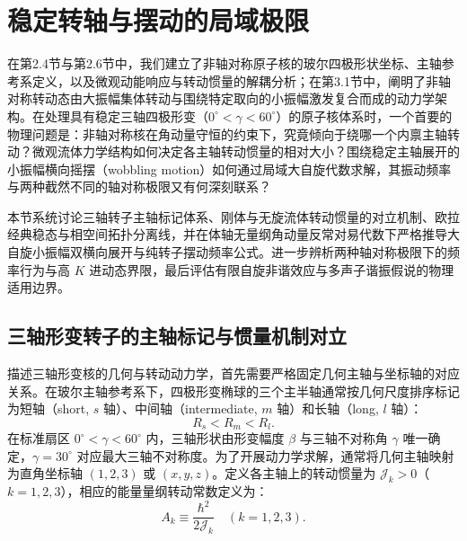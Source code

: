 \section{稳定转轴与摆动的局域极限}\label{sec:3-2}

在第2.4节与第2.6节中，我们建立了非轴对称原子核的玻尔四极形状坐标、主轴参考系定义，以及微观动能响应与转动惯量的解耦分析；在第3.1节中，阐明了非轴对称转动态由大振幅集体转动与围绕特定取向的小振幅激发复合而成的动力学架构。在处理具有稳定三轴四极形变（$0^\circ < \gamma < 60^\circ$）的原子核体系时，一个首要的物理问题是：非轴对称核在角动量守恒的约束下，究竟倾向于绕哪一个内禀主轴转动？微观流体力学结构如何决定各主轴转动惯量的相对大小？围绕稳定主轴展开的小振幅横向摇摆（wobbling motion）如何通过局域大自旋代数求解，其振动频率与两种截然不同的轴对称极限又有何深刻联系？

本节系统讨论三轴转子主轴标记体系、刚体与无旋流体转动惯量的对立机制、欧拉经典稳态与相空间拓扑分离线，并在体轴无量纲角动量反常对易代数下严格推导大自旋小振幅双横向展开与纯转子摆动频率公式。进一步辨析两种轴对称极限下的频率行为与高 $K$ 进动态界限，最后评估有限自旋非谐效应与多声子谐振假说的物理适用边界。

\subsection{三轴形变转子的主轴标记与惯量机制对立}\label{sec:3-2-1}

描述三轴形变核的几何与转动动力学，首先需要严格固定几何主轴与坐标轴的对应关系。在玻尔主轴参考系下，四极形变椭球的三个主半轴通常按几何尺度排序标记为短轴（short, $s$ 轴）、中间轴（intermediate, $m$ 轴）和长轴（long, $l$ 轴）：
\begin{equation}\label{eq:3-2-axes-order}
R_s < R_m < R_l.
\end{equation}
在标准扇区 $0^\circ < \gamma < 60^\circ$ 内，三轴形状由形变幅度 $\beta$ 与三轴不对称角 $\gamma$ 唯一确定，$\gamma = 30^\circ$ 对应最大三轴不对称度。为了开展动力学求解，通常将几何主轴映射为直角坐标轴 $(1, 2, 3)$ 或 $(x, y, z)$。定义各主轴上的转动惯量为 $\mathcal{J}_k > 0$（$k = 1, 2, 3$），相应的能量量纲转动常数定义为：
\begin{equation}\label{eq:3-2-rot-constants}
A_k \equiv \frac{\hbar^2}{2\mathcal{J}_k} \quad (k = 1, 2, 3).
\end{equation}

